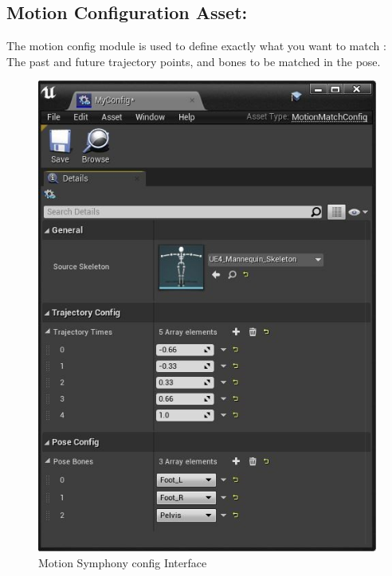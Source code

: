 \documentclass[12pt]{book}
\begin{document}
\subsection{Motion Configuration Asset:}
The motion config module is used to define exactly what you want to match : The past and
future trajectory points, and bones to be matched in the pose.
\begin{figure}[!h]
    \centering
    \includegraphics[scale=0.3]{./Figures/Images/Motion Symphony/MMConfigDetails.jpeg}
    \caption{Motion Symphony config Interface}
    \label{Motion Symphony Config Interface}
\end{figure}
\end{document}
